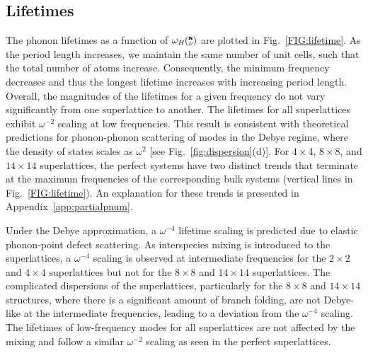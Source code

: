 \documentclass[aps,prb,preprint,preprintnumbers,amsmath,amssymb,floatfix,superscriptaddress]{revtex4}
\newcommand{\kv}{\mspace{-4.0mu}\left(\mspace{-8.0mu}
\begin{smallmatrix}&\pmb{\kappa} \\&\nu\end{smallmatrix}
\mspace{-3.0mu}\right)}
\begin{document}

\subsection{Lifetimes}

The phonon lifetimes as a function of $\omega_H \kv$ are plotted in Fig.~\ref{FIG:lifetime}. As the period length increases, we maintain the same number of unit cells, such that the total number of atoms increase. Consequently, the minimum frequency decreases and thus the longest lifetime increases with increasing period length. Overall, the magnitudes of the lifetimes for a given frequency do not vary significantly from one superlattice to another. The lifetimes for all superlattices exhibit $\omega^{-2}$ scaling at low frequencies. This result is consistent with theoretical predictions for phonon-phonon scattering of modes in the Debye regime, where the density of states scales as $\omega^{2}$ [see Fig.~\ref{fig:dispersion}(d)].\cite{Klemens_Thermal_1951} For $4\times4$, $8\times8$, and $14\times14$ superlattices, the perfect systems have two distinct trends that terminate at the maximum frequencies of the corresponding bulk systems (vertical lines in Fig.~\ref{FIG:lifetime}). An explanation for these trends is presented in Appendix~\ref{app:partialpnum}.

Under the Debye approximation, a $\omega^{-4}$ lifetime scaling is predicted due to elastic phonon-point defect scattering.\cite{PhysRev.140.A1812,klemens_scattering_1955-3, klemens_thermal_1957-2} As interspecies mixing is introduced to the superlattices, a $\omega^{-4}$ scaling is observed at intermediate frequencies for the $2\times2$ and $4\times4$ superlattices but not for the $8\times8$ and $14\times14$ superlattices. The complicated dispersions of the superlattices, particularly for the $8\times8$ and $14\times14$ structures, where there is a significant amount of branch folding, are not Debye-like at the intermediate frequencies, leading to a deviation from the $\omega^{-4}$ scaling. The lifetimes of low-frequency modes for all superlattices are not affected by the mixing and follow a similar $\omega^{-2}$ scaling as seen in the perfect superlattices.
\end{document}
